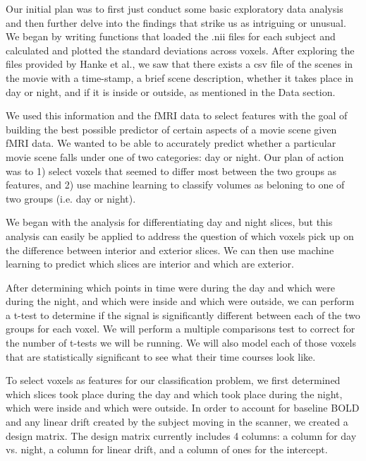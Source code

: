 Our initial plan was to first just conduct some basic exploratory data
analysis and then further delve into the findings that strike us as intriguing
or unusual. We began by writing functions that loaded the .nii files for each
subject and calculated and plotted the standard deviations across voxels.
After exploring the files provided by Hanke et al., we saw that there exists a
csv file of the scenes in the movie with a time-stamp, a brief scene
description, whether it takes place in day or night, and if it is inside or
outside, as mentioned in the Data section.

We used this information and the fMRI data to select features with the goal of
building the best possible predictor of certain aspects of a movie scene given
fMRI data. We wanted to be able to accurately predict whether a particular
movie scene falls under one of two categories: day or night.  Our plan of 
action was to 1) select voxels that seemed to differ most between the two 
groups as features, and 2) use machine learning to classify volumes as 
beloning to one of two groups (i.e. day or night).

We began with the analysis for differentiating day and night slices, but this
analysis can easily be applied to address the question of which voxels pick up
on the difference between interior and exterior slices.  We can then use
machine learning to predict which slices are interior and which are exterior.

After determining which points in time were during the day and which were
during the night, and which were inside and which were outside, we can perform
a t-test to determine if the signal is significantly different between each of
the two groups for each voxel.  We will perform a multiple comparisons test to
correct for the number of t-tests we will be running.   We will also model
each of those voxels that are statistically significant to see what their time
courses look like.

To select voxels as features for our classification problem, we first
determined which slices took place during the day and which took place during
the night, which were inside and which were outside.  In order to account for
baseline BOLD and any linear drift created by the subject moving in the
scanner, we created a design matrix.  The design matrix currently includes 4
columns: a column for day vs. night, a column for linear drift, and a column 
of ones for the intercept.

